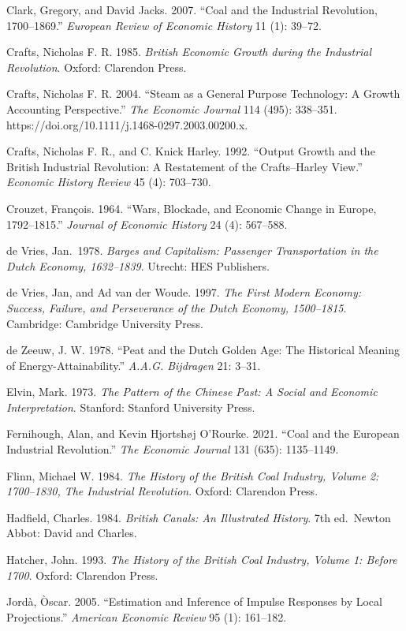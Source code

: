\documentclass[
  11pt,
]{article}
\begin{document}
Clark, Gregory, and David Jacks. 2007. ``Coal and the Industrial
Revolution, 1700--1869.'' \emph{European Review of Economic History} 11
(1): 39--72.

Crafts, Nicholas F. R. 1985. \emph{British Economic Growth during the
Industrial Revolution}. Oxford: Clarendon Press.

Crafts, Nicholas F. R. 2004. ``Steam as a General Purpose Technology: A
Growth Accounting Perspective.'' \emph{The Economic Journal} 114 (495):
338--351. https://doi.org/10.1111/j.1468-0297.2003.00200.x.

Crafts, Nicholas F. R., and C. Knick Harley. 1992. ``Output Growth and
the British Industrial Revolution: A Restatement of the Crafts--Harley
View.'' \emph{Economic History Review} 45 (4): 703--730.

Crouzet, François. 1964. ``Wars, Blockade, and Economic Change in
Europe, 1792--1815.'' \emph{Journal of Economic History} 24 (4):
567--588.

de Vries, Jan.~1978. \emph{Barges and Capitalism: Passenger
Transportation in the Dutch Economy, 1632--1839}. Utrecht: HES
Publishers.

de Vries, Jan, and Ad van der Woude. 1997. \emph{The First Modern
Economy: Success, Failure, and Perseverance of the Dutch Economy,
1500--1815}. Cambridge: Cambridge University Press.

de Zeeuw, J. W. 1978. ``Peat and the Dutch Golden Age: The Historical
Meaning of Energy-Attainability.'' \emph{A.A.G. Bijdragen} 21: 3--31.

Elvin, Mark. 1973. \emph{The Pattern of the Chinese Past: A Social and
Economic Interpretation}. Stanford: Stanford University Press.

Fernihough, Alan, and Kevin Hjortshøj O'Rourke. 2021. ``Coal and the
European Industrial Revolution.'' \emph{The Economic Journal} 131 (635):
1135--1149.

Flinn, Michael W. 1984. \emph{The History of the British Coal Industry,
Volume 2: 1700--1830, The Industrial Revolution}. Oxford: Clarendon
Press.

Hadfield, Charles. 1984. \emph{British Canals: An Illustrated History}.
7th ed.~Newton Abbot: David and Charles.

Hatcher, John. 1993. \emph{The History of the British Coal Industry,
Volume 1: Before 1700}. Oxford: Clarendon Press.

Jordà, Òscar. 2005. ``Estimation and Inference of Impulse Responses by
Local Projections.'' \emph{American Economic Review} 95 (1): 161--182.
\end{document}
